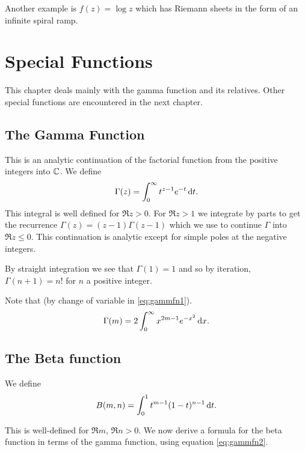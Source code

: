 \documentclass{notes}
\theoremstyle{plain}
\begin{document}
Another example is $f(z) = \log z$ which has Riemann sheets in the form
of an infinite spiral ramp.

\chapter{Special Functions}

This chapter deals mainly with the gamma function and its relatives.
Other special functions are encountered in the next chapter.

\section{The Gamma Function}

This is an analytic continuation of the factorial function from the
positive integers into $\mathbb{C}$.  We define
\begin{equation}\label{eq:gammfn1}
\Gamma(z) = \int_0^\infty t^{z-1} e^{-t}\, \mathrm{d} t.
\end{equation}
This integral is well defined for $\Re z > 0$.  For $\Re z > 1$
we integrate by parts to get the recurrence
$\Gamma(z) = (z-1) \Gamma(z-1)$ which we use to continue $\Gamma$
into $\Re z \le 0$.  This continuation is analytic except for simple
poles at the negative integers.

By straight integration we see that $\Gamma(1) = 1$ and so
by iteration, $\Gamma(n+1) = n!$ for $n$ a positive integer. 

\vspace{2in}

Note that (by change of variable in \eqref{eq:gammfn1}).
\begin{equation}\label{eq:gammfn2}
\Gamma(m) = 2 \int_0^\infty x^{2 m - 1} e^{-x^2}\, \mathrm{d} x.
\end{equation}

\section{The Beta function}

We define
\begin{equation}\label{eq:betafn1}
B(m,n) = \int_0^1 t^{m-1} (1-t)^{n-1}\,\mathrm{d} t.
\end{equation}

This is well-defined for $\Re m$, $\Re n > 0$.  We now derive a
formula for the beta function in terms of the gamma function, using equation
\eqref{eq:gammfn2}.
\end{document}
